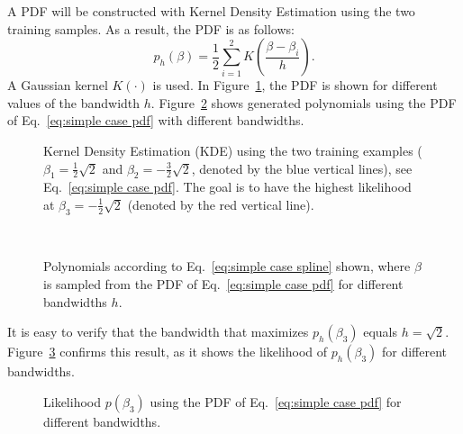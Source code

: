 \documentclass[10pt,final,a4paper,oneside,onecolumn]{article}
\newlength\figurewidth
\newlength\figureheight
\theoremstyle{plain}\newtheorem{definition}{Definition}[section]    %
\theoremstyle{definition}\newtheorem{example}{Example}[section]     %
\theoremstyle{remark}\newtheorem{remarkenv}{Remark}[section]        %
\begin{document}
A PDF will be constructed with Kernel Density Estimation using the two training samples.  As a result, the PDF is as follows:
\begin{equation} \label{eq:simple case pdf}
	p_h(\beta) = \frac{1}{2} \sum_{i=1}^2 K \left( \frac{\beta - \beta_i}{h} \right).
\end{equation}
A Gaussian kernel $K(\cdot)$ is used. In Figure~\ref{fig:simple case pdf}, the PDF is shown for different values of the bandwidth $h$. Figure~\ref{fig:simple example splines} shows generated polynomials using the PDF of Eq.~\eqref{eq:simple case pdf} with different bandwidths. 

\begin{figure}
	\centering
	\setlength\figureheight{200pt}
	\setlength\figurewidth{300pt}
	
	\caption{Kernel Density Estimation (KDE) using the two training examples ($\beta_1=\frac{1}{2}\sqrt{2}$ and $\beta_2=-\frac{3}{2}\sqrt{2}$, denoted by the blue vertical lines), see Eq.~\eqref{eq:simple case pdf}. The goal is to have the highest likelihood at $\beta_3=-\frac{1}{2}\sqrt{2}$ (denoted by the red vertical line).}
	\label{fig:simple case pdf}
\end{figure}

\begin{figure}
	\centering
	\setlength\figureheight{100pt}
	\setlength{}
	\subfloat[$h=0.01$]{}
	\subfloat[$h=0.1$]{}
	\subfloat[$h=0.2$]{}\\
	\subfloat[$h=0.5$]{}
	\subfloat[$h=1$]{}
	\subfloat[$h=2$]{}
	\caption{Polynomials according to Eq.~\eqref{eq:simple case spline} shown, where $\beta$ is sampled from the PDF of Eq.~\eqref{eq:simple case pdf} for different bandwidths $h$.}
	\label{fig:simple example splines}
\end{figure}

It is easy to verify that the bandwidth that maximizes $p_h(\beta_3)$ equals $h=\sqrt{2}$. Figure~\ref{fig:simple case likelihood} confirms this result, as it shows the likelihood of $p_h(\beta_3)$ for different bandwidths. 

\begin{figure}
	\centering
	\setlength\figureheight{200pt}
	\setlength\figurewidth{300pt}
	
	\caption{Likelihood $p(\beta_3)$ using the PDF of Eq.~\eqref{eq:simple case pdf} for different bandwidths.}
	\label{fig:simple case likelihood}
\end{figure}
\end{document}
